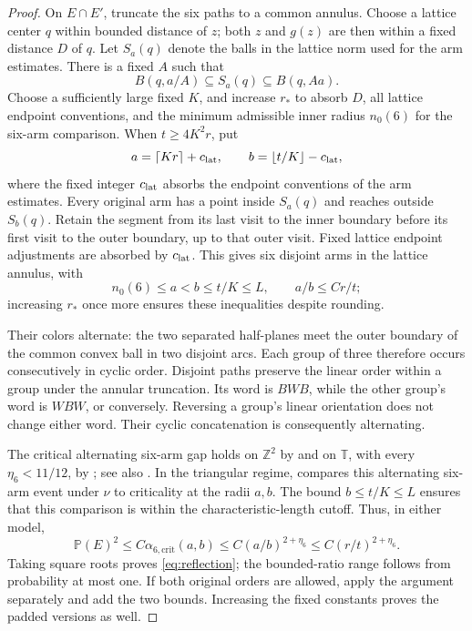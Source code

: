 \documentclass[11pt]{amsart}
\theoremstyle{remark}
\newcommand{\Prob}{\mathbb P}
\begin{document}
\begin{proof}
On $E\cap E'$, truncate the six paths to a common annulus. Choose a lattice
center $q$ within bounded distance of $z$; both $z$ and $g(z)$ are then
within a fixed distance $D$ of $q$. Let $S_a(q)$ denote the balls in the
lattice norm used for the arm estimates. There is a fixed $A$ such that
\[
 B(q,a/A)\subseteq S_a(q)\subseteq B(q,Aa).
\]
Choose a sufficiently large fixed $K$, and increase $r_*$ to absorb $D$,
all lattice endpoint conventions, and the minimum admissible inner radius
$n_0(6)$ for the six-arm comparison.
When $t\ge4K^2r$, put
\[
 a=\lceil Kr\rceil+c_{\rm lat},\qquad
 b=\lfloor t/K\rfloor-c_{\rm lat},
\]
where the fixed integer $c_{\rm lat}$ absorbs the endpoint conventions of
the arm estimates.
Every original arm has a point inside $S_a(q)$ and reaches outside
$S_b(q)$. Retain the segment from its last visit to the inner boundary
before its first visit to the outer boundary, up to that outer visit.
Fixed lattice endpoint adjustments are absorbed by $c_{\rm lat}$.
This gives six disjoint arms in the lattice annulus, with
\[
 n_0(6)\le a<b\le t/K\le L,
 \qquad a/b\le C r/t;
\]
increasing $r_*$ once more ensures these inequalities despite rounding.

Their colors alternate: the two separated half-planes meet the outer boundary
of the common convex ball in two disjoint arcs.  Each group of three therefore occurs
consecutively in cyclic order.  Disjoint paths preserve the linear order
within a group under the annular truncation.  Its word is $BWB$, while
the other group's word is $WBW$, or conversely.  Reversing a group's
linear orientation does not change either word.  Their cyclic
concatenation is consequently alternating.

The critical alternating six-arm gap holds on $\mathbb Z^2$ by \cite[Corollary~A.8]{SS} and on $\mathbb T$, with every $\eta_6<11/12$, by \cite{SW}; see also \cite[Remark~4.6]{GPS}. In the triangular regime,
\cite[Theorem~27]{Nolin} compares this alternating six-arm event under
$\nu$ to criticality at the radii $a,b$. The bound $b\le t/K\le L$
ensures that this comparison is within the characteristic-length cutoff.
Thus, in either model,
\[
 \Prob(E)^2\le C\alpha_{6,\mathrm{crit}}(a,b)
 \le C(a/b)^{2+\eta_6}
 \le C(r/t)^{2+\eta_6}.
\]
Taking square roots proves \eqref{eq:reflection}; the bounded-ratio
range follows from probability at most one.  If both original orders
are allowed, apply the argument separately and add the two bounds.
Increasing the fixed constants proves the padded versions as well.
\end{proof}
\end{document}

